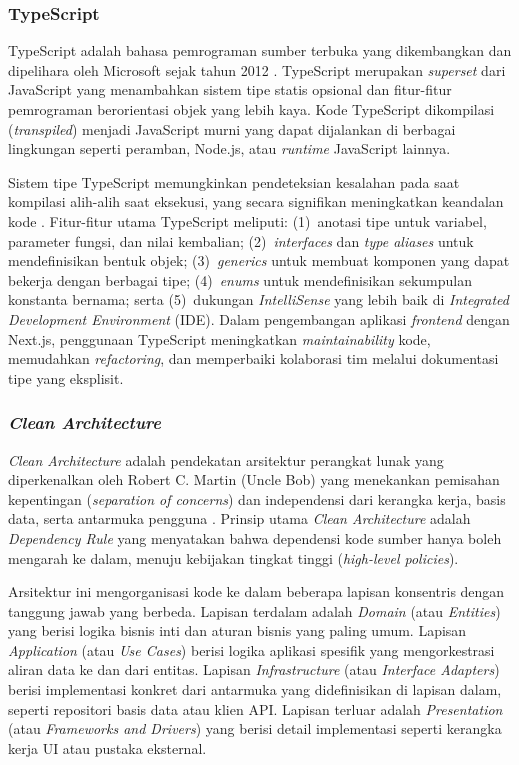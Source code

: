 \subsubsection{TypeScript}

TypeScript adalah bahasa pemrograman sumber terbuka yang dikembangkan dan dipelihara oleh Microsoft sejak tahun 2012 \citep{TypeScript_2026_Docs}. TypeScript merupakan \textit{superset} dari JavaScript yang menambahkan sistem tipe statis opsional dan fitur-fitur pemrograman berorientasi objek yang lebih kaya. Kode TypeScript dikompilasi (\textit{transpiled}) menjadi JavaScript murni yang dapat dijalankan di berbagai lingkungan seperti peramban, Node.js, atau \textit{runtime} JavaScript lainnya.

Sistem tipe TypeScript memungkinkan pendeteksian kesalahan pada saat kompilasi alih-alih saat eksekusi, yang secara signifikan meningkatkan keandalan kode \citep{Bierman_2014_TypeScript}. Fitur-fitur utama TypeScript meliputi: (1)~anotasi tipe untuk variabel, parameter fungsi, dan nilai kembalian; (2)~\textit{interfaces} dan \textit{type aliases} untuk mendefinisikan bentuk objek; (3)~\textit{generics} untuk membuat komponen yang dapat bekerja dengan berbagai tipe; (4)~\textit{enums} untuk mendefinisikan sekumpulan konstanta bernama; serta (5)~dukungan \textit{IntelliSense} yang lebih baik di \textit{Integrated Development Environment} (IDE). Dalam pengembangan aplikasi \textit{frontend} dengan Next.js, penggunaan TypeScript meningkatkan \textit{maintainability} kode, memudahkan \textit{refactoring}, dan memperbaiki kolaborasi tim melalui dokumentasi tipe yang eksplisit.

\subsubsection{\textit{Clean Architecture}}

\textit{Clean Architecture} adalah pendekatan arsitektur perangkat lunak yang diperkenalkan oleh Robert C. Martin (Uncle Bob) yang menekankan pemisahan kepentingan (\textit{separation of concerns}) dan independensi dari kerangka kerja, basis data, serta antarmuka pengguna \citep{Martin_2017_CleanArchitecture}. Prinsip utama \textit{Clean Architecture} adalah \textit{Dependency Rule} yang menyatakan bahwa dependensi kode sumber hanya boleh mengarah ke dalam, menuju kebijakan tingkat tinggi (\textit{high-level policies}).

Arsitektur ini mengorganisasi kode ke dalam beberapa lapisan konsentris dengan tanggung jawab yang berbeda. Lapisan terdalam adalah \textit{Domain} (atau \textit{Entities}) yang berisi logika bisnis inti dan aturan bisnis yang paling umum. Lapisan \textit{Application} (atau \textit{Use Cases}) berisi logika aplikasi spesifik yang mengorkestrasi aliran data ke dan dari entitas. Lapisan \textit{Infrastructure} (atau \textit{Interface Adapters}) berisi implementasi konkret dari antarmuka yang didefinisikan di lapisan dalam, seperti repositori basis data atau klien API. Lapisan terluar adalah \textit{Presentation} (atau \textit{Frameworks and Drivers}) yang berisi detail implementasi seperti kerangka kerja UI atau pustaka eksternal.

